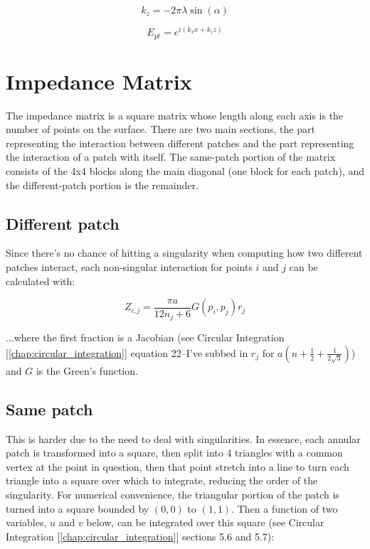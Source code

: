 \documentclass[etd,twoside,senior,noacknowledgments]{BYUPhys}
\begin{document}
\begin{equation}
  k_{z}=-2\pi\lambda\sin\left(\alpha\right)
\end{equation}

\begin{equation}
  E_{pt}=e^{i\left(k_{x}x+k_{z}z\right)}
\end{equation}



\section{Impedance Matrix} \label{sec:impedance}

The impedance matrix is a square matrix whose length along each axis is the number of points on the surface. There are two main sections, the part representing the interaction between different patches and the part representing the interaction of a patch with itself. The same-patch portion of the matrix consists of the 4x4 blocks along the main diagonal (one block for each patch), and the different-patch portion is the remainder.

\subsection{Different patch} \label{sec:different_patch}

Since there's no chance of hitting a singularity when computing how two different patches interact, each non-singular interaction for points $i$ and $j$ can be calculated with:

\begin{equation}
  Z_{i,j}=\frac{\pi a}{12n_{j}+6}G\left(p_{i},p_{j}\right)r_{j}
\end{equation}

...where the first fraction is a Jacobian (see Circular Integration [\ref{chap:circular_integration}] equation 22--I've subbed in $r_{j}$ for $a\left(n+\frac{1}{2}+\frac{1}{2\sqrt{3}}\right)$) and $G$ is the Green's function.

\subsection{Same patch} \label{sec:same_patch}

This is harder due to the need to deal with singularities. In essence, each annular patch is transformed into a square, then split into 4 triangles with a common vertex at the point in question, then that point stretch into a line to turn each triangle into a square over which to integrate, reducing the order of the singularity. For numerical convenience, the triangular portion of the patch is turned into a square bounded by $(0,0)$ to $(1,1)$. Then a function of two variables, $u$ and $v$ below, can be integrated over this square (see Circular Integration [\ref{chap:circular_integration}] sections 5.6 and 5.7):
\end{document}

